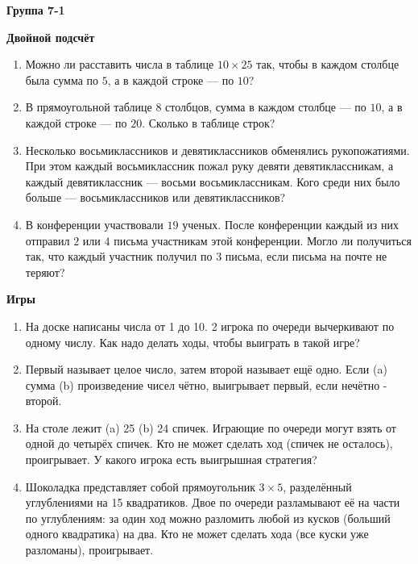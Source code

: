 \documentclass{article}
\begin{document}
\large


\begin{center}
\textbf{Группа 7-1}
\end{center}

\begin{center}
	\textbf{Двойной подсчёт}
\end{center}

\begin{enumerate}[label*=\protect\fbox{\arabic{enumi}}]

\item Можно ли расставить числа в таблице $10 \times 25$ так, чтобы в каждом столбце была сумма по $5$, а в каждой строке — по $10$?

\item В прямоугольной таблице $8$ столбцов, сумма в каждом столбце — по $10$, а в каждой строке — по $20$. Сколько в таблице строк?

\item Несколько восьмиклассников и девятиклассников обменялись рукопожатиями. При этом каждый восьмиклассник пожал руку девяти девятиклассникам, а каждый девятиклассник — восьми восьмиклассникам.
Кого среди них было больше — восьмиклассников или девятиклассников?

\item В конференции участвовали $19$ ученых. После конференции каждый из них отправил $2$ или $4$ письма участникам этой конференции. Могло ли получиться так, что каждый участник получил по $3$ письма, если письма на почте не теряют?

\end{enumerate}


\begin{center}
	\textbf{Игры}
\end{center}

\begin{enumerate}[label*=\protect\fbox{\arabic{enumi}}]
	
	\item На доске написаны числа от 1 до 10. 2 игрока по очереди вычеркивают по одному числу. Как надо делать ходы, чтобы выиграть в такой игре?
	
	\item Первый называет целое число, затем второй называет ещё одно. Если (a) сумма (b) произведение чисел чётно, выигрывает первый, если нечётно - второй.
	
	\item На столе лежит (a) 25 (b) 24 спичек. Играющие по очереди могут взять от одной до четырёх спичек. Кто не может сделать ход (спичек не осталось), проигрывает. У какого игрока есть выигрышная стратегия?
	
	\item Шоколадка представляет собой прямоугольник $3 \times 5$, разделённый углублениями на 15 квадратиков. Двое по очереди разламывают её на части по углублениям: за один ход можно разломить любой из кусков (больший одного квадратика) на два. Кто не может сделать хода (все куски уже разломаны), проигрывает.
	
\end{enumerate}
\end{document}
